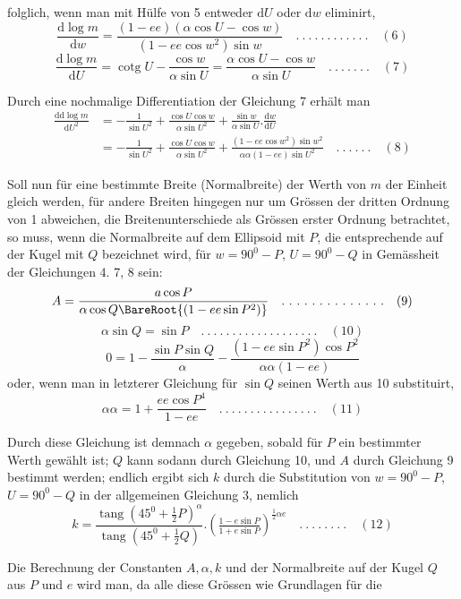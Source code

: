%
folglich, wenn man mit Hülfe von 5 entweder \(\mathrm{d}U\) oder \(\mathrm{d}w\) eliminirt,
\[
\frac{\mathrm{d}\log m}{\mathrm{d}w}=\frac{(1-ee)(\alpha\cos U-\cos w)}{(1-ee\cos w^2)\sin w} \quad .\ .\ .\ .\ .\ .\ .\ .\ .\ .\ .\ .\quad(6)
\]
\[
\frac{\mathrm{d}\log m}{\mathrm{d}U}=\operatorname{cotg}U-\frac{\cos w}{\alpha\sin U}=\frac{\alpha\cos U-\cos w}{\alpha\sin U} \quad .\ .\ .\ .\ .\ .\ .\quad(7)
\]

Durch eine nochmalige Differentiation der Gleichung 7 erhält man
\[
\begin{aligned}
\frac{\mathrm{dd}\log m}{\mathrm{d}U^2}&=-\frac{1}{\sin U^2}+\frac{\cos U\cos w}{\alpha\sin U^2}+\frac{\sin w}{\alpha\sin U}\mathord{.}\frac{\mathrm{d}w}{\mathrm{d}U}\\
&=-\frac{1}{\sin U^2}+\frac{\cos U\cos w}{\alpha\sin U^2}+\frac{(1-ee\cos w^2)\sin w^2}{\alpha\alpha(1-ee)\sin U^2} \quad .\ .\ .\ .\ .\ .\quad(8)
\end{aligned}
\]

Soll nun für eine bestimmte Breite (Normalbreite) der Werth von \(m\) der Einheit gleich werden, für andere Breiten hingegen nur um Grössen der dritten Ordnung von 1 abweichen, die Breitenunterschiede als Grössen erster Ordnung betrachtet, so muss, wenn die Normalbreite auf dem Ellipsoid mit \(P\), die entsprechende auf der Kugel mit \(Q\) bezeichnet wird, für \(w=90^0-P\), \(U=90^0-Q\) in Gemässheit der Gleichungen 4. 7, 8 sein:
\[
A=\frac{a\cos P}{\alpha\cos Q\BareRoot{(1-ee\sin P^2)}} \quad .\ .\ .\ .\ .\ .\ .\ .\ .\ .\ .\ .\ .\ .\quad(9)
\]
\[
\alpha\sin Q=\sin P \quad .\ .\ .\ .\ .\ .\ .\ .\ .\ .\ .\ .\ .\ .\ .\ .\ .\ .\ .\quad(10)
\]
\[
0=1-\frac{\sin P\sin Q}{\alpha}-\frac{(1-ee\sin P^2)\cos P^2}{\alpha\alpha(1-ee)}
\]
oder, wenn man in letzterer Gleichung für \(\sin Q\) seinen Werth aus 10 substituirt,
\[
\alpha\alpha=1+\frac{ee\cos P^4}{1-ee} \quad .\ .\ .\ .\ .\ .\ .\ .\ .\ .\ .\ .\ .\ .\ .\ .\quad(11)
\]

Durch diese Gleichung ist demnach \(\alpha\) gegeben, sobald für \(P\) ein bestimmter Werth gewählt ist; \(Q\) kann sodann durch Gleichung 10, und \(A\) durch Gleichung 9 bestimmt werden; endlich ergibt sich \(k\) durch die Substitution von \(w=90^0-P\), \(U=90^0-Q\) in der allgemeinen Gleichung 3, nemlich
\[
k=\frac{\operatorname{tang}(45^0+\frac{1}{2}P)^\alpha}{\operatorname{tang}(45^0+\frac{1}{2}Q)}\mathord{.}(\tfrac{1-e\sin P}{1+e\sin P})^{\frac{1}{2}\alpha e} \quad .\ .\ .\ .\ .\ .\ .\ .\quad(12)
\]

\indent Die Berechnung der Constanten \(A,\alpha,k\) und der Normalbreite auf der Kugel \(Q\) aus \(P\) und \(e\) wird man, da alle diese Grössen wie Grundlagen für die
